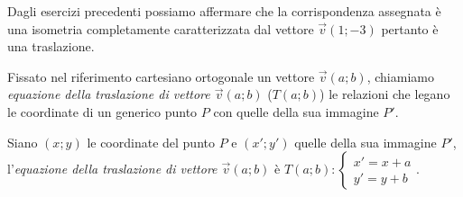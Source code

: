 Dagli esercizi precedenti possiamo affermare che la corrispondenza assegnata è una isometria completamente caratterizzata dal vettore $\vec{v}(1;-3)$ pertanto è una traslazione.

\begin{definizione}
Fissato nel riferimento cartesiano ortogonale un vettore $\vec{v}(a;b)$, chiamiamo \emph{equazione della traslazione di vettore $\vec{v}(a;b)$} ($T(a;b)$) le relazioni che legano le coordinate di un generico punto $P$ con quelle della sua immagine $P'$.
\end{definizione}

\begin{definizione}
Siano $(x;y)$ le coordinate del punto $P$ e $(x';y')$ quelle della sua immagine $P'$, l'\emph{equazione della traslazione di vettore $\vec{v}(a;b)$} è $T(a;b):\begin{cases}x'=x+a\\y'=y+b\end{cases}$.
\end{definizione}

\begin{comment}
58   Nel riferimento cartesiano è assegnato il punto P(-4;2); determinate il punto P’ immagine nella traslazione .
Strategia risolutiva:
1. individuate il vettore  della traslazione: 
2. tracciate il vettore nel riferimento cartesiano
3. determinate le coordinate di P’: P’(…;….)
Completate:  è … … … … a ; questo significa che i due vettori hanno … … … direzione (cioè sono … … … …), stesso … … …  e … … … … intensità.
59   Nello stesso riferimento dopo aver fissato un punto Q(…;…) e il punto Q’(…;…) immagine nella stessa traslazione TR(3,-1), dimostrate con le conoscenze di geometria sintetica che PP’Q’Q è un parallelogrammo.
Ipotesi: PP’QQ’; PP’… QQ’                                  
Tesi: … … … 
Dimostrazione:
60   Sappiamo che l’ equazione di una traslazione è . Assegnate le coordinate (x,y) di un punto P e (x’,y’) della sua immagine P’, le componenti del vettore della traslazione sono date da:
[A]			[B]	[C]
[D]			[E]
61   Dopo aver determinato l’equazione della traslazione in cui A’(0,-2) è l’immagine di A(3, 2), determinate il perimetro del triangolo AO’A’ essendo O’ il corrispondente di O(0,0) nella traslazione trovata.
62   Verificate che il punto medio M del segmento PQ di estremi P(-1,4) e Q(5,0) ha come immagine in TR(3,-1) il punto medio M’ del segmento P’Q’. 
63   Applica la traslazione di equazione  al segmento di estremi A(-2;4) B(3;3). 
64   Dati A(1;0) e B(0,2), determina C e D in modo che ABCD sia un quadrato.
65   Determinate l’immagine del triangolo di vertici A(0,2), B(-3,2), C(0,5) nella traslazione TR(4,1); calcolatene perimetro e area.

66   Determinate l’equazione della traslazione di vettore  assegnati dalla figura 3. Determinate inoltre l’immagine del poligono di vertici H(-1,1), K(0,-2), L(3,0), F(1,2).

67   Un vettore  ha modulo unitario, è applicato nell’origine e forma con l’asse delle ascisse un angolo di 30°. Determinate le sue componenti e scrivete l’equazione della traslazione da esso caratterizzata.
\end{comment}

